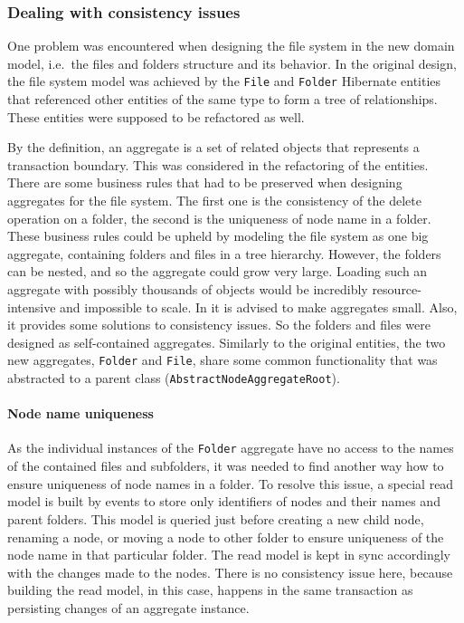 \documentclass{book}
\begin{document}
\subsubsection{Dealing with consistency
issues}\label{dealing-with-consistency-issues}

One problem was encountered when designing the file system in the new
domain model, i.e.~the files and folders structure and its behavior. In
the original design, the file system model was achieved by the
\texttt{File} and \texttt{Folder} Hibernate entities that referenced
other entities of the same type to form a tree of relationships. These
entities were supposed to be refactored as well.

By the definition, an aggregate is a set of related objects that
represents a transaction boundary. This was considered in the
refactoring of the entities. There are some business rules that had to
be preserved when designing aggregates for the file system. The first
one is the consistency of the delete operation on a folder, the second
is the uniqueness of node name in a folder. These business rules could
be upheld by modeling the file system as one big aggregate, containing
folders and files in a tree hierarchy. However, the folders can be
nested, and so the aggregate could grow very large. Loading such an
aggregate with possibly thousands of objects would be incredibly
resource-intensive and impossible to scale. In
\cite{aggregate1}\cite{aggregate2}\cite{aggregate3} it is advised to
make aggregates small. Also, it provides some solutions to consistency
issues. So the folders and files were designed as self-contained
aggregates. Similarly to the original entities, the two new aggregates,
\texttt{Folder} and \texttt{File}, share some common functionality that
was abstracted to a parent class (\texttt{AbstractNodeAggregateRoot}).

\paragraph{Node name uniqueness}\label{node-name-uniqueness}

As the individual instances of the \texttt{Folder} aggregate have no
access to the names of the contained files and subfolders, it was needed
to find another way how to ensure uniqueness of node names in a folder.
To resolve this issue, a special read model is built by events to store
only identifiers of nodes and their names and parent folders. This model
is queried just before creating a new child node, renaming a node, or
moving a node to other folder to ensure uniqueness of the node name in
that particular folder. The read model is kept in sync accordingly with
the changes made to the nodes. There is no consistency issue here,
because building the read model, in this case, happens in the same
transaction as persisting changes of an aggregate instance.
\end{document}
